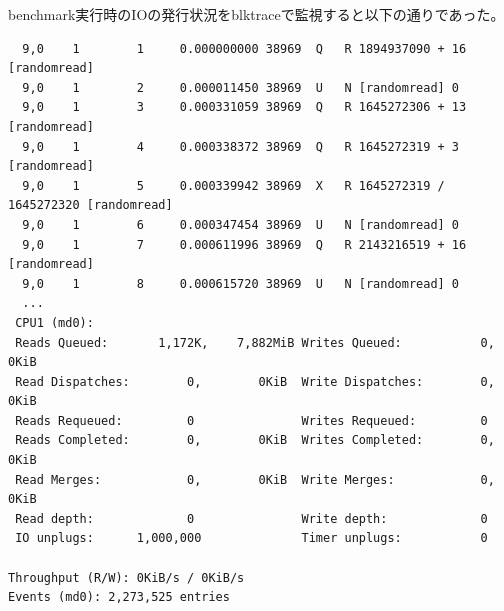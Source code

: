 \documentclass[11pt,a4paper]{jsarticle}
\begin{document}
\clearpage
benchmark実行時のIOの発行状況をblktraceで監視すると以下の通りであった。
\begin{verbatim}
  9,0    1        1     0.000000000 38969  Q   R 1894937090 + 16 [randomread]
  9,0    1        2     0.000011450 38969  U   N [randomread] 0
  9,0    1        3     0.000331059 38969  Q   R 1645272306 + 13 [randomread]
  9,0    1        4     0.000338372 38969  Q   R 1645272319 + 3 [randomread]
  9,0    1        5     0.000339942 38969  X   R 1645272319 / 1645272320 [randomread]
  9,0    1        6     0.000347454 38969  U   N [randomread] 0
  9,0    1        7     0.000611996 38969  Q   R 2143216519 + 16 [randomread]
  9,0    1        8     0.000615720 38969  U   N [randomread] 0
  ...
 CPU1 (md0):
 Reads Queued:       1,172K,    7,882MiB Writes Queued:           0,        0KiB
 Read Dispatches:        0,        0KiB  Write Dispatches:        0,        0KiB
 Reads Requeued:         0               Writes Requeued:         0
 Reads Completed:        0,        0KiB  Writes Completed:        0,        0KiB
 Read Merges:            0,        0KiB  Write Merges:            0,        0KiB
 Read depth:             0               Write depth:             0
 IO unplugs:      1,000,000              Timer unplugs:           0

Throughput (R/W): 0KiB/s / 0KiB/s
Events (md0): 2,273,525 entries
\end{verbatim}

\clearpage
\end{document}
